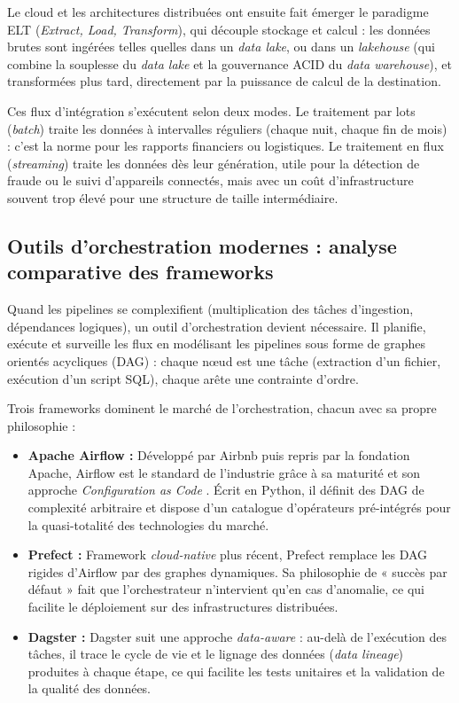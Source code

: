 Le cloud et les architectures distribuées ont ensuite fait émerger le paradigme ELT (\textit{Extract, Load, Transform}), qui découple stockage et calcul \cite{reisFundamentalsDataEngineering2022} : les données brutes sont ingérées telles quelles dans un \textit{data lake}, ou dans un \textit{lakehouse} (qui combine la souplesse du \textit{data lake} et la gouvernance ACID du \textit{data warehouse}), et transformées plus tard, directement par la puissance de calcul de la destination. 

Ces flux d'intégration s'exécutent selon deux modes. Le traitement par lots (\textit{batch}) traite les données à intervalles réguliers (chaque nuit, chaque fin de mois) : c'est la norme pour les rapports financiers ou logistiques. Le traitement en flux (\textit{streaming}) traite les données dès leur génération, utile pour la détection de fraude ou le suivi d'appareils connectés, mais avec un coût d'infrastructure souvent trop élevé pour une structure de taille intermédiaire.

\subsection{Outils d'orchestration modernes : analyse comparative des frameworks}

Quand les pipelines se complexifient (multiplication des tâches d'ingestion, dépendances logiques), un outil d'orchestration devient nécessaire. Il planifie, exécute et surveille les flux en modélisant les pipelines sous forme de graphes orientés acycliques (DAG) : chaque nœud est une tâche (extraction d'un fichier, exécution d'un script SQL), chaque arête une contrainte d'ordre.

Trois frameworks dominent le marché de l'orchestration, chacun avec sa propre philosophie :

\begin{itemize}
    \item \textbf{Apache Airflow :} Développé par Airbnb puis repris par la fondation Apache, Airflow est le standard de l'industrie grâce à sa maturité et son approche \textit{Configuration as Code} \cite{fix_airflowDocumentation2026}. Écrit en Python, il définit des DAG de complexité arbitraire et dispose d'un catalogue d'opérateurs pré-intégrés pour la quasi-totalité des technologies du marché.
    \item \textbf{Prefect :} Framework \textit{cloud-native} plus récent, Prefect remplace les DAG rigides d'Airflow par des graphes dynamiques. Sa philosophie de « succès par défaut » fait que l'orchestrateur n'intervient qu'en cas d'anomalie, ce qui facilite le déploiement sur des infrastructures distribuées.
    \item \textbf{Dagster :} Dagster suit une approche \textit{data-aware} : au-delà de l'exécution des tâches, il trace le cycle de vie et le lignage des données (\textit{data lineage}) produites à chaque étape, ce qui facilite les tests unitaires et la validation de la qualité des données.
\end{itemize}

